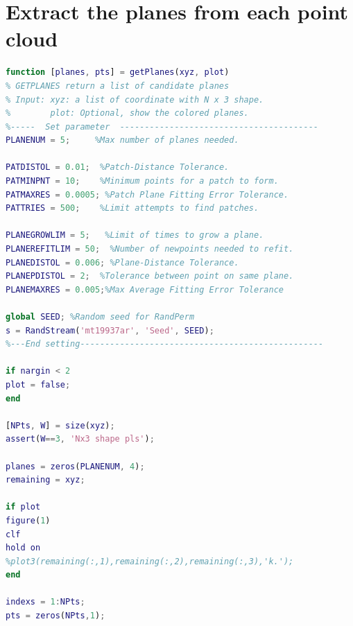 \documentclass[10pt,a4paper]{article}
\begin{document}
\section{Extract the planes from each point cloud}
	\label{algapp:plane} 
\begin{lstlisting}[language=matlab]
%%
function [planes, pts] = getPlanes(xyz, plot)
% GETPLANES return a list of candidate planes
% Input: xyz: a list of coordinate with N x 3 shape.
%        plot: Optional, show the colored planes.
%-----  Set parameter  ----------------------------------------
PLANENUM = 5;     %Max number of planes needed.

PATDISTOL = 0.01;  %Patch-Distance Tolerance.
PATMINPNT = 10;    %Minimum points for a patch to form.
PATMAXRES = 0.0005; %Patch Plane Fitting Error Tolerance. 
PATTRIES = 500;    %Limit attempts to find patches. 

PLANEGROWLIM = 5;   %Limit of times to grow a plane.
PLANEREFITLIM = 50;  %Number of newpoints needed to refit.
PLANEDISTOL = 0.006; %Plane-Distance Tolerance.
PLANEPDISTOL = 2;  %Tolerance between point on same plane.
PLANEMAXRES = 0.005;%Max Average Fitting Error Tolerance 

global SEED; %Random seed for RandPerm
s = RandStream('mt19937ar', 'Seed', SEED);
%---End setting-------------------------------------------------

if nargin < 2 
plot = false;
end

[NPts, W] = size(xyz);
assert(W==3, 'Nx3 shape pls');

planes = zeros(PLANENUM, 4);
remaining = xyz;

if plot
figure(1)
clf
hold on
%plot3(remaining(:,1),remaining(:,2),remaining(:,3),'k.');
end

indexs = 1:NPts;
pts = zeros(NPts,1);


\end{lstlisting}
\end{document}
